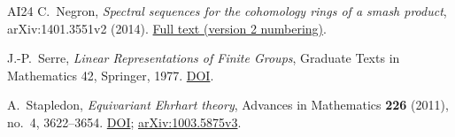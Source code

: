 \documentclass[11pt,a4paper]{article}
\numberwithin{equation}{section}
\theoremstyle{definition}
\theoremstyle{remark}
\begin{document}
\begin{thebibliography}{AI24}
C.~Negron,
\emph{Spectral sequences for the cohomology rings of a smash product},
arXiv:1401.3551v2 (2014).
\href{https://arxiv.org/html/1401.3551v2}{Full text (version 2 numbering)}.

J.-P.~Serre, \emph{Linear Representations of Finite Groups},
Graduate Texts in Mathematics 42, Springer, 1977.
\href{https://doi.org/10.1007/978-1-4684-9458-7}{DOI}.

A.~Stapledon, \emph{Equivariant Ehrhart theory},
Advances in Mathematics \textbf{226} (2011), no.~4, 3622--3654.
\href{https://doi.org/10.1016/j.aim.2010.10.019}{DOI};
\href{https://arxiv.org/html/1003.5875v3}{arXiv:1003.5875v3}.
\end{thebibliography}
\end{document}

